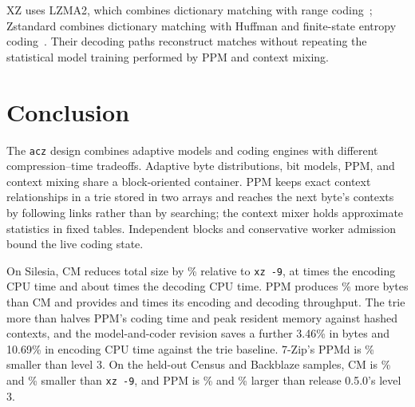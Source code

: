 \documentclass[10pt,letterpaper]{article}
\newcommand{\acz}{\texttt{acz}}
\newcommand{\code}[1]{\texttt{#1}}
\begin{document}
XZ uses LZMA2, which combines dictionary matching with range coding~\cite{xz}; Zstandard combines dictionary matching with Huffman and finite-state entropy coding~\cite{zstd}. Their decoding paths reconstruct matches without repeating the statistical model training performed by PPM and context mixing.

\section{Conclusion}
The \acz{} design combines adaptive models and coding engines with different compression--time tradeoffs. Adaptive byte distributions, bit models, PPM, and context mixing share a block-oriented container. PPM keeps exact context relationships in a trie stored in two arrays and reaches the next byte's contexts by following links rather than by searching; the context mixer holds approximate statistics in fixed tables. Independent blocks and conservative worker admission bound the live coding state.

On Silesia, CM reduces total size by \CmSmallerXz\% relative to \code{xz -9}, at \CmXzEncodeRatio{} times the encoding CPU time and about \CmXzDecodeRatio{} times the decoding CPU time. PPM produces \PpmLargerCM{}\% more bytes than CM and provides \PpmCMEncodeRatio{} and \PpmCMDecodeRatio{} times its encoding and decoding throughput. The trie more than halves PPM's coding time and peak resident memory against hashed contexts, and the model-and-coder revision saves a further 3.46\% in bytes and 10.69\% in encoding CPU time against the trie baseline. 7-Zip's PPMd is \PpmRefSmaller{}\% smaller than level 3. On the held-out Census and Backblaze samples, CM is \CensusCMSmallerXz\% and \BackblazeCMSmallerXz\% smaller than \mbox{\code{xz -9}}, and PPM is \CensusPpmLargerPort\% and \BackblazePpmLargerPort\% larger than release 0.5.0's level 3.
\end{document}
